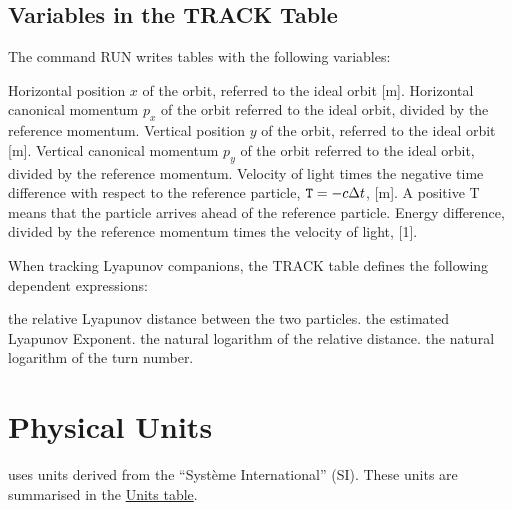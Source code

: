 \subsection{Variables in the TRACK Table}
\label{subsec:tables_track}
The command RUN writes tables with the following variables: 
\begin{madlist}
   Horizontal position $x$ of the orbit, referred to the
  ideal orbit [m].    
   Horizontal canonical momentum $p_x$ of the orbit
  referred to the ideal orbit, divided by the reference momentum.    
   Vertical position $y$ of the orbit, referred to the
  ideal orbit [m].    
   Vertical canonical momentum $p_y$ of the orbit
  referred to the ideal orbit, divided by the reference momentum.    
   Velocity of light times the negative time difference with
  respect to the reference particle, $\hbox{\tt T}=-c\Delta t$, [m]. 
  A positive T means that the particle arrives ahead of the reference
  particle.    
   Energy difference, divided by the reference momentum times
  the velocity of light, [1].
\end{madlist} 

When tracking Lyapunov companions, the TRACK table defines the following
dependent expressions:  
\begin{madlist}
   the relative Lyapunov distance between the two particles.    
   the estimated Lyapunov Exponent.   
   the natural logarithm of the relative distance.   
   the natural logarithm of the turn number.   
\end{madlist}





\section{Physical Units}
\label{sec:units}
\madx uses units derived from the ``Syst\`eme
International'' (SI). These units are summarised in the
\hyperlink{table}{Units table}.  

